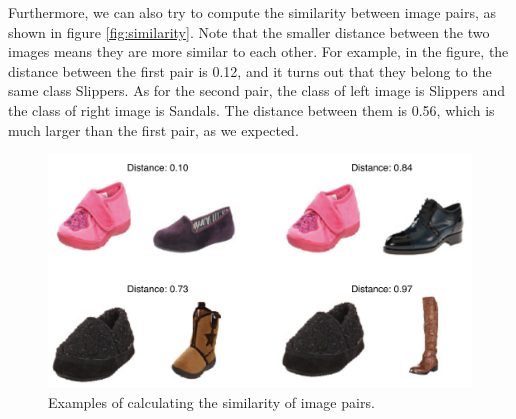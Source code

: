 Furthermore, we can also try to compute the similarity between image pairs, as shown in figure \ref{fig:similarity}. Note that the smaller distance between the two images means they are more similar to each other. For example, in the figure, the distance between the first pair is 0.12, and it turns out that they belong to the same class Slippers. As for the second pair, the class of left image is Slippers and the class of right image is Sandals. The distance between them is 0.56, which is much larger than the first pair, as we expected. 

\begin{figure}[h]
  \centering
  \includegraphics[width=\linewidth]{figs/similarity.png}
  \caption{Examples of calculating the similarity of image pairs.}
  \label{}
\end{figure}


